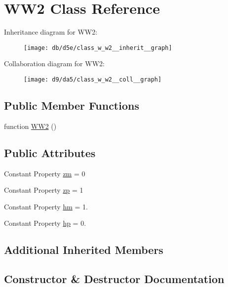 \hypertarget{class_w_w2}{}\section{W\+W2 Class Reference}
\label{class_w_w2}


Inheritance diagram for W\+W2\+:
\nopagebreak
\begin{figure}[H]
\begin{center}
\leavevmode
\texttt{[image: db/d5e/class\_w\_w2\_\_inherit\_\_graph]}
\end{center}
\end{figure}


Collaboration diagram for W\+W2\+:
\nopagebreak
\begin{figure}[H]
\begin{center}
\leavevmode
\texttt{[image: d9/da5/class\_w\_w2\_\_coll\_\_graph]}
\end{center}
\end{figure}
\subsection*{Public Member Functions}
\begin{DoxyCompactItemize}
\item 
function \hyperlink{class_w_w2_a9d824ee2fff7a4ead49f79b0b7b233d3}{W\+W2} ()
\end{DoxyCompactItemize}
\subsection*{Public Attributes}
\begin{DoxyCompactItemize}
\item 
Constant Property \hyperlink{class_w_w2_add7f59c196008cedc40cf9b34b20ff11}{zm} = 0
\item 
Constant Property \hyperlink{class_w_w2_abf68edbbbb168109075633bfd64c8526}{zp} = 1
\item 
Constant Property \hyperlink{class_w_w2_aea7dd312041ae265d7444d07db1ef17b}{hm} = 1.
\item 
Constant Property \hyperlink{class_w_w2_a00485f31d922ba9c0a04fc2d4ec34468}{hp} = 0.
\end{DoxyCompactItemize}
\subsection*{Additional Inherited Members}


\subsection{Constructor \& Destructor Documentation}
\mbox{\label{class_w_w2_a9d824ee2fff7a4ead49f79b0b7b233d3}} 
